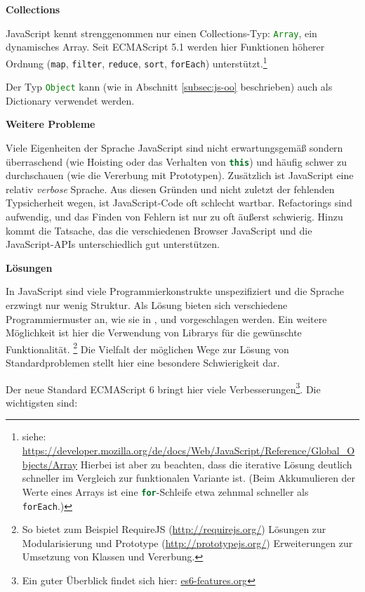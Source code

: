 \documentclass[a4paper, 12pt, hidelinks, listof=totoc, listoftables=totoc, bibliography=totoc]{scrreprt}
\newcommand{\js}[1]{\lstinline[language=JavaScript, style=inline]|#1|}
\newcommand{\MyMiniSec}[1]{\rmfamily\fontsize{12}{15}\selectfont
	\vspace{7pt}\textbf{#1} %
}
\begin{document}
\MyMiniSec{Collections}

JavaScript kennt strenggenommen nur einen Collections-Typ: \js{Array}, ein dynamisches Array. Seit ECMAScript 5.1 werden hier Funktionen höherer Ordnung (\js{map}, \js{filter}, \js{reduce}, \js{sort}, \js{forEach}) unterstützt.\footnote{siehe: \url{https://developer.mozilla.org/de/docs/Web/JavaScript/Reference/Global_Objects/Array} Hierbei ist aber zu beachten, dass die iterative Lösung deutlich schneller im Vergleich zur funktionalen Variante ist. (Beim Akkumulieren der Werte eines Arrays ist eine \js{for}-Schleife etwa zehnmal schneller als \js{forEach}.)}

Der Typ \js{Object} kann (wie in Abschnitt \ref{subsec:js-oo} beschrieben) auch als Dictionary verwendet werden.


\MyMiniSec{Weitere Probleme}

Viele Eigenheiten der Sprache JavaScript sind nicht erwartungsgemäß sondern überraschend (wie Hoisting oder das Verhalten von \js{this}) und häufig schwer zu durchschauen (wie die Vererbung mit Prototypen). Zusätzlich ist JavaScript eine relativ \emph{verbose} Sprache. Aus diesen Gründen und nicht zuletzt der fehlenden Typsicherheit wegen, ist JavaScript-Code oft schlecht wartbar. Refactorings sind aufwendig, und das Finden von Fehlern ist nur zu oft äußerst schwierig. Hinzu kommt die Tatsache, das die verschiedenen Browser JavaScript und die JavaScript-\ac{API}s unterschiedlich gut unterstützen.


\MyMiniSec{Lösungen}

In JavaScript sind viele Programmierkonstrukte unspezifiziert und die Sprache erzwingt nur wenig Struktur. Als Lösung bieten sich verschiedene Programmiermuster an, wie sie in \cite{crockford2008.JSG}, \cite{stefanov2010.JSP} und \cite{flanagan2011} vorgeschlagen werden. Ein weitere Möglichkeit ist hier die Verwendung von Librarys für die gewünschte Funktionalität. \footnote{So bietet zum Beispiel RequireJS (\url{http://requirejs.org/}) Lösungen zur Modularisierung und  Prototype (\url{http://prototypejs.org/}) Erweiterungen zur Umsetzung von Klassen und Vererbung.} Die Vielfalt der möglichen Wege zur Lösung von Standardproblemen stellt hier eine besondere Schwierigkeit dar.

Der neue Standard ECMAScript 6 bringt hier viele Verbesserungen\footnote{Ein guter Überblick findet sich hier: \url{es6-features.org}}. Die wichtigsten sind:
\end{document}
